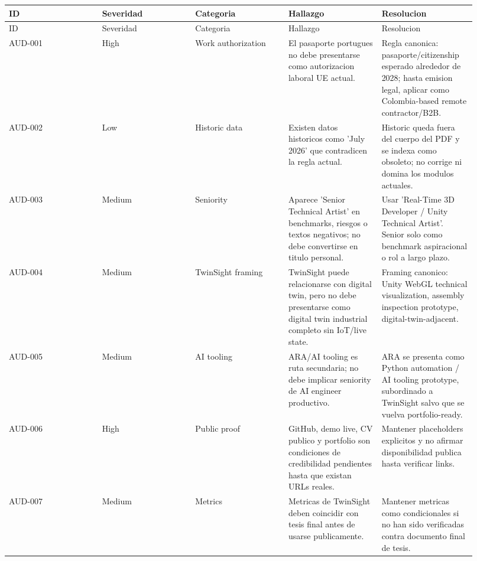 \begin{center}
\scriptsize
\begin{longtable}{>{\raggedright\arraybackslash}p{0.184\linewidth} >{\raggedright\arraybackslash}p{0.184\linewidth} >{\raggedright\arraybackslash}p{0.184\linewidth} >{\raggedright\arraybackslash}p{0.184\linewidth} >{\raggedright\arraybackslash}p{0.184\linewidth}}
\toprule
ID & Severidad & Categoria & Hallazgo & Resolucion \\
\midrule
\endfirsthead
\toprule
ID & Severidad & Categoria & Hallazgo & Resolucion \\
\midrule
\endhead
AUD-001 & High & Work authorization & El pasaporte portugues no debe presentarse como autorizacion laboral UE actual. & Regla canonica: pasaporte/citizenship esperado alrededor de 2028; hasta emision legal, aplicar como Colombia-based remote contractor/B2B. \\
AUD-002 & Low & Historic data & Existen datos historicos como 'July 2026' que contradicen la regla actual. & Historic queda fuera del cuerpo del PDF y se indexa como obsoleto; no corrige ni domina los modulos actuales. \\
AUD-003 & Medium & Seniority & Aparece 'Senior Technical Artist' en benchmarks, riesgos o textos negativos; no debe convertirse en titulo personal. & Usar 'Real-Time 3D Developer / Unity Technical Artist'. Senior solo como benchmark aspiracional o rol a largo plazo. \\
AUD-004 & Medium & TwinSight framing & TwinSight puede relacionarse con digital twin, pero no debe presentarse como digital twin industrial completo sin IoT/live state. & Framing canonico: Unity WebGL technical visualization, assembly inspection prototype, digital-twin-adjacent. \\
AUD-005 & Medium & AI tooling & ARA/AI tooling es ruta secundaria; no debe implicar seniority de AI engineer productivo. & ARA se presenta como Python automation / AI tooling prototype, subordinado a TwinSight salvo que se vuelva portfolio-ready. \\
AUD-006 & High & Public proof & GitHub, demo live, CV publico y portfolio son condiciones de credibilidad pendientes hasta que existan URLs reales. & Mantener placeholders explicitos y no afirmar disponibilidad publica hasta verificar links. \\
AUD-007 & Medium & Metrics & Metricas de TwinSight deben coincidir con tesis final antes de usarse publicamente. & Mantener metricas como condicionales si no han sido verificadas contra documento final de tesis. \\

\end{longtable}
\end{center}
